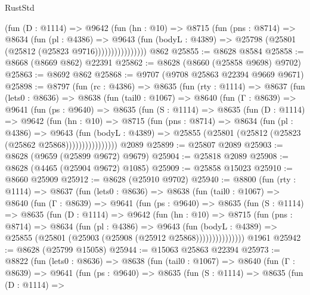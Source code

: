 \begin{lexlean}{RustStd}
\begin{coremodule}
                    (fun (D : @1114) =>
                    @9642
                      (fun (hn : @10) =>
                      @8715
                        (fun (pns : @8714) =>
                        @8634
                          (fun (pl : @4386) =>
                          @9643
                            (fun (bodyL : @4389) =>
                            @25798 (@25801 (@25812 (@25823 @9716))))))))))))))))
    @862
@25855 := @8628 @8584
@25858 := @8668 (@8669 @862) @22391
@25862 := @8628 (@8660 (@25858 @9698) @9702)
@25863 := @8692 @862
@25868 := @9707 (@9708 @25863 @22394 @9669 @9671)
@25898 := @8797
    (fun (rc : @4386) =>
    @8635
      (fun (rty : @1114) =>
      @8637
        (fun (lets0 : @8636) =>
        @8638
          (fun (tail0 : @1067) =>
          @8640
            (fun (Γ : @8639) =>
            @9641
              (fun (ps : @9640) =>
              @8635
                (fun (S : @1114) =>
                @8635
                  (fun (D : @1114) =>
                  @9642
                    (fun (hn : @10) =>
                    @8715
                      (fun (pns : @8714) =>
                      @8634
                        (fun (pl : @4386) =>
                        @9643
                          (fun (bodyL : @4389) =>
                          @25855 (@25801 (@25812 (@25823 (@25862 @25868))))))))))))))))
    @2089
@25899 := @25807 @2089
@25903 := @8628 (@9659 (@25899 @9672) @9679)
@25904 := @25818 @2089
@25908 := @8628 (@4465 (@25904 @9672) @1085)
@25909 := @25858 @15023
@25910 := @8660 @25909
@25912 := @8628 (@25910 @9702)
@25940 := @8800
    (fun (rty : @1114) =>
    @8637
      (fun (lets0 : @8636) =>
      @8638
        (fun (tail0 : @1067) =>
        @8640
          (fun (Γ : @8639) =>
          @9641
            (fun (ps : @9640) =>
            @8635
              (fun (S : @1114) =>
              @8635
                (fun (D : @1114) =>
                @9642
                  (fun (hn : @10) =>
                  @8715
                    (fun (pns : @8714) =>
                    @8634
                      (fun (pl : @4386) =>
                      @9643
                        (fun (bodyL : @4389) =>
                        @25855 (@25801 (@25903 (@25908 (@25912 @25868)))))))))))))))
    @1961
@25942 := @8628 (@25799 @15058)
@25944 := @15063 @25863 @22394
@25973 := @8822
    (fun (lets0 : @8636) =>
    @8638
      (fun (tail0 : @1067) =>
      @8640
        (fun (Γ : @8639) =>
        @9641
          (fun (ps : @9640) =>
          @8635
            (fun (S : @1114) =>
            @8635
              (fun (D : @1114) =>

\end{coremodule}
\end{lexlean}
